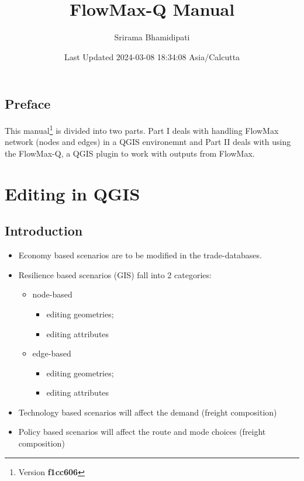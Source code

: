 \documentclass[
]{book}
\title{FlowMax-Q Manual}
\author{Srirama Bhamidipati}
\date{Last Updated 2024-03-08 18:34:08 Asia/Calcutta}
\providecommand{\tightlist}{%
  \setlength{\itemsep}{0pt}\setlength{\parskip}{0pt}}
\begin{document}
\maketitle

{
\setcounter{tocdepth}{1}
\tableofcontents
}
\chapter*{Preface}\label{preface}

This manual\footnote{Version \textbf{f1cc606}} is divided into two parts. Part I deals with handling FlowMax network (nodes and edges) in a QGIS environemnt and Part II deals with using the FlowMax-Q, a QGIS plugin to work with outputs from FlowMax.

\part*{Editing in QGIS}\label{part-editing-in-qgis}

\chapter{Introduction}\label{introduction}

\begin{itemize}
\tightlist
\item
  Economy based scenarios are to be modified in the trade-databases.
\item
  Resilience based scenarios (GIS) fall into 2 categories:

  \begin{itemize}
  \tightlist
  \item
    node-based

    \begin{itemize}
    \tightlist
    \item
      editing geometries;
    \item
      editing attributes
    \end{itemize}
  \item
    edge-based

    \begin{itemize}
    \tightlist
    \item
      editing geometries;
    \item
      editing attributes
    \end{itemize}
  \end{itemize}
\item
  Technology based scenarios will affect the demand (freight composition)
\item
  Policy based scenarios will affect the route and mode choices (freight composition)
\end{itemize}
\end{document}
